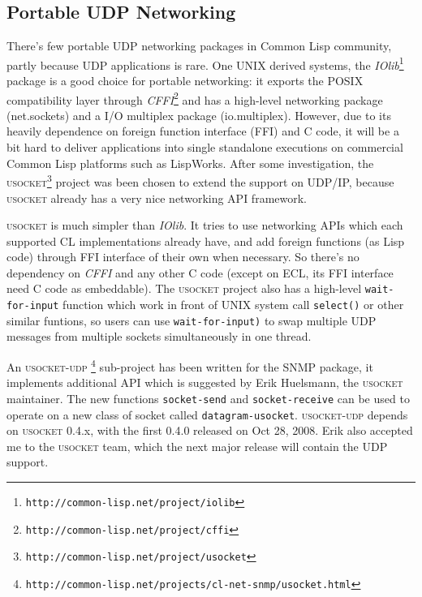 \documentclass[reprint,9pt]{sigplanconf}
\begin{document}

\subsection{Portable UDP Networking}

There's few portable UDP networking packages in Common Lisp community,
partly because UDP applications is rare. One UNIX derived systems, the
\textsl{IOlib}\footnote{\texttt{http://common-lisp.net/project/iolib}}
package is a good choice for portable networking: it exports the POSIX
compatibility layer through
\textsl{CFFI}\footnote{\texttt{http://common-lisp.net/project/cffi}}
and has a high-level networking package (net.sockets) and a I/O
multiplex package (io.multiplex). However, due to its heavily dependence
on foreign function interface (FFI) and C code, it will be a bit hard
to deliver applications into single standalone executions on commercial
Common Lisp platforms such as LispWorks. After some investigation,
the \textsc{usocket}\footnote{\texttt{http://common-lisp.net/project/usocket}}
project was been chosen to extend the support on UDP/IP, because \textsc{usocket}
already has a very nice networking API framework.

\textsc{usocket} is much simpler than \textsl{IOlib}. It tries to use
networking APIs which each supported CL implementations already have, and
add foreign functions (as Lisp code) through FFI interface of their own when
necessary. So there's no dependency on \textsl{CFFI} and any other C
code (except on ECL, its FFI interface need C code as embeddable). The
\textsc{usocket} project also has a high-level \texttt{wait-for-input}
function which work in front of UNIX system call \texttt{select()}
or other similar funtions, so users can use \texttt{wait-for-input)}
to swap multiple UDP messages from multiple sockets simultaneously
in one thread.

An \textsc{usocket-udp}
\footnote{\texttt{http://common-lisp.net/projects/cl-net-snmp/usocket.html}} sub-project has been written for the SNMP package,
it implements additional API which is suggested by Erik Huelsmann,
the \textsc{usocket} maintainer. The new functions \texttt{socket-send} and
\texttt{socket-receive} can be used to operate on a new class of
socket called \texttt{datagram-usocket}. \textsc{usocket-udp} depends
on \textsc{usocket} 0.4.x, with the first 0.4.0 released on Oct 28,
2008. Erik also accepted me to the \textsc{usocket} team, which the
next major release will contain the UDP support.
\end{document}
